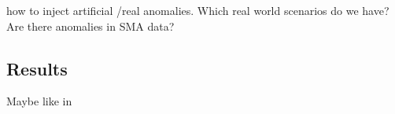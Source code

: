 %
%
%
%
%
%
%
%
%
%
%
%
%
%
%
%
%
how to inject artificial \cite{darban_carla_2024} /real anomalies. Which real world scenarios do we have? Are there anomalies in SMA data?
\subsection{Results}
Maybe like in 

